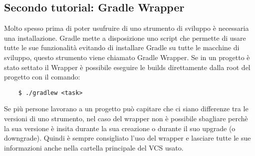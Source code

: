 \subsection{Secondo tutorial: Gradle Wrapper}
Molto spesso prima di poter usufruire di uno strumento di sviluppo è necessaria una installazione. Gradle mette a disposizione uno script che permette di usare tutte le sue funzionalità evitando di installare Gradle su tutte le macchine di sviluppo, questo strumento viene chiamato Gradle Wrapper. Se in un progetto è stato settato il Wrapper è possibile eseguire le builds direttamente dalla root del progetto con il comando:
\begin{verbatim}
    $ ./gradlew <task> \end{verbatim}
Se più persone lavorano a un progetto può capitare che ci siano differenze tra le versioni di uno strumento, nel caso del wrapper non è possibile sbagliare perchè la sua versione è insita durante la sua creazione o durante il suo upgrade (o downgrade). Quindi è sempre consigliato l'uso del wrapper e lasciare tutte le sue informazioni anche nella cartella principale del VCS usato.

